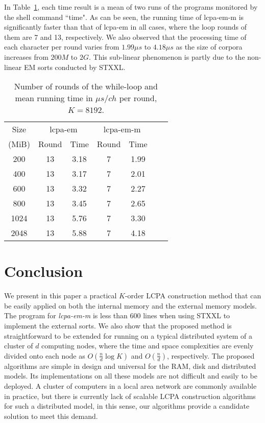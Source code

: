 \documentclass{llncs}
\begin{document}
In Table~\ref{tbl:exp:result}, each time result is a mean of two runs of the programs monitored by the shell command ``time". As can be seen, the running time of {lcpa-em-m} is significantly faster than that of {lcpa-em} in all cases, where the loop rounds of them are 7 and 13, respectively. We also observed that the processing time of each character per round varies from $1.99\mu s$ to $4.18\mu s$ as the size of corpora increases from $200M$ to $2G$. This sub-linear phenomenon is partly due to the non-linear {EM} sorts conducted by {STXXL}.

\begin{table}
\centering
\label{tbl:exp:result}
\caption{\label{tbl:exp:result} Number of rounds of the while-loop and mean running time in $\mu s/ch$ per round, $K=8192$.}
\begin{tabular}{|c|c|c|c|c|c|c|}
\hline
Size &
\multicolumn{2}{c|}{lcpa-em} &
\multicolumn{2}{c|}{lcpa-em-m} \\
\cline{2-5}
 (MiB) & Round & Time & Round & Time\\
\hline
200 & 13 & 3.18 & 7 & 1.99\\
\hline
400 & 13 & 3.17 & 7 & 2.01\\
\hline
600 & 13 & 3.32 & 7 & 2.27\\
\hline
800 & 13 & 3.45 & 7 & 2.65\\
\hline
1024 & 13 & 5.76 & 7 & 3.30\\
\hline
2048 & 13 & 5.88 & 7 & 4.18\\
\hline
\end{tabular}
\end{table}

\section{Conclusion}\label{sec:conclusion}

We present in this paper a practical $K$-order LCPA construction method that can be easily applied on both the internal memory and the external memory models. The program for {\em lcpa-em-m} is less than 600 lines when using {STXXL} to implement the external sorts. We also show that the proposed method is straightforward to be extended for running on a typical distributed system of a cluster of $d$ computing nodes, where the time and space complexities are evenly divided onto each node as $O(\frac{n}{d}\log K)$ and $O(\frac{n}{d})$, respectively. The proposed algorithms are simple in design and universal for the RAM, disk and distributed models. Its implementations on all these models are not difficult and easily to be deployed.
A cluster of computers in a local area network are commonly available in practice, but there is currently lack of scalable LCPA construction algorithms for such a distributed model, in this sense, 
our algorithms provide a candidate solution to meet this demand.



\end{document}
